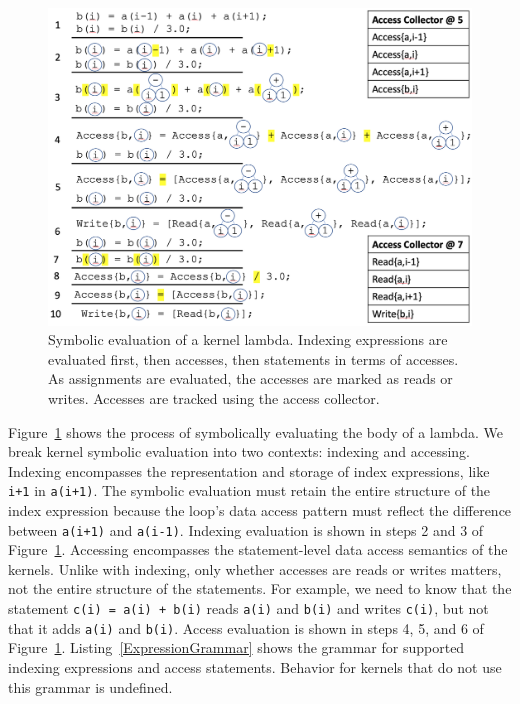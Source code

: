 \documentclass{article}
\begin{document}
\begin{figure}
\includegraphics[width=\linewidth]{SymExecProcess.png}
\caption{Symbolic evaluation of a kernel lambda. 
Indexing expressions are evaluated first, then accesses, then statements in terms of accesses.
As assignments are evaluated, the accesses are marked as reads or writes.
Accesses are tracked using the access collector.}
\label{symExec}
\end{figure}

Figure~\ref{symExec} shows the process of symbolically evaluating the body of a lambda. 
We break kernel symbolic evaluation into two contexts: indexing and accessing. 
Indexing encompasses the representation and storage of index expressions, like
\verb.i+1. in \verb.a(i+1)..
The symbolic evaluation must retain the entire structure of the index expression 
because the loop's
data access pattern must reflect the difference between \verb.a(i+1). and
\verb.a(i-1)..
Indexing evaluation is shown in steps 2 and 3 of Figure~\ref{symExec}.
Accessing encompasses the statement-level data access semantics of the kernels.
Unlike with indexing, only whether accesses are reads or writes matters,
not the entire structure of the statements.
For example, we need to know that the statement \verb.c(i) = a(i) + b(i).
reads \verb.a(i). and \verb.b(i). and writes \verb.c(i)., but not that it
adds \verb.a(i). and \verb.b(i)..
Access evaluation is shown in steps 4, 5, and 6 of Figure~\ref{symExec}.
Listing~\ref{ExpressionGrammar} shows the grammar for supported indexing expressions and access statements. 
Behavior for kernels that do not use this grammar is undefined.
\end{document}

